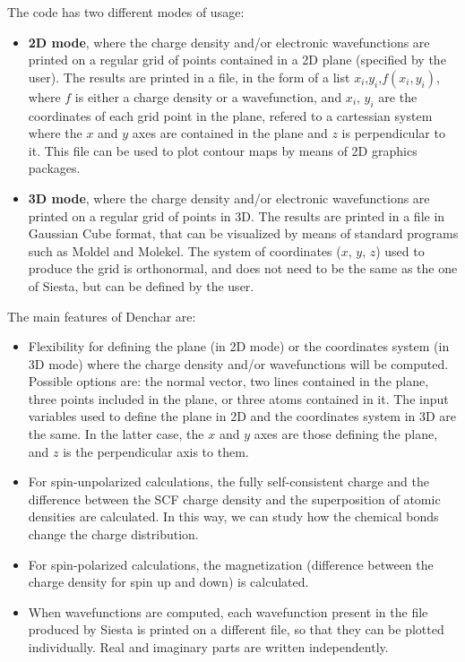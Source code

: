 The code has two different modes of usage:

\begin{itemize}

\item{\bf 2D mode}, where the charge density and/or electronic
wavefunctions are printed on a regular grid of points contained
in a 2D plane (specified by the user). 
The results are printed in a file, in the form
of a list $x_i$,$y_i$,$f(x_i,y_i)$, where $f$ is either a
charge density or a wavefunction, and $x_i$, $y_i$ are the coordinates
of each grid point in the plane, refered to a cartessian system
where the $x$ and $y$ axes are contained in the plane and $z$ is
perpendicular to it.
This file can be used to plot contour maps by means of
2D graphics packages.

\item{\bf 3D mode}, where the charge density and/or electronic
wavefunctions are printed on a regular grid of points in 3D.
The results are printed in a file in Gaussian Cube
format, that can be visualized by means of standard programs
such as {\sc Moldel} and {\sc Molekel}. The system of coordinates
($x$, $y$, $z$) used to produce the grid is orthonormal, and 
does not need to be the same as the one of {\sc Siesta}, but
can be defined by the user.

\end{itemize}

The main features of {\sc Denchar} are:
\begin{itemize}

\item
Flexibility for defining the plane (in 2D mode) or the
coordinates system (in 3D mode) where the charge density and/or
wavefunctions will be computed.
Possible options are: the normal vector, 
two lines contained in the plane,
three points included in the plane,
or three atoms contained in it.
The input variables used to define the plane in 2D and the
coordinates system in 3D are the same. In the latter case, the
$x$ and $y$ axes are those defining the plane, and $z$ is
the perpendicular axis to them.

\item
For spin-unpolarized calculations, the fully self-consistent charge and
the difference between the SCF charge density and the superposition of atomic
densities are calculated. In this way, we can study how the chemical bonds 
change the charge distribution.
 
\item
For spin-polarized calculations, the magnetization (difference between
the charge density for spin up and down) is calculated.

\item
When wavefunctions are computed, each wavefunction present in the
file produced by {\sc Siesta} is printed on a different file, 
so that they can be plotted individually. Real and imaginary
parts are written independently.

\end{itemize}


